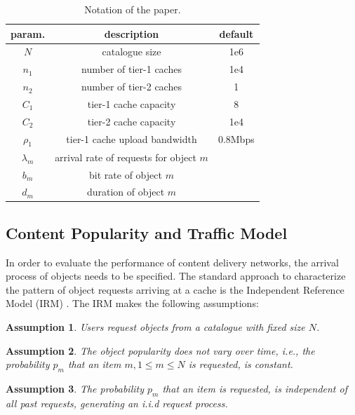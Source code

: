 \begin{table}[tb]
\centering
\caption{Notation of the paper.}
\label{tab:notation}
\begin{tabular}{|c|c|c|}
\hline
param. & description & default \\
\hline
$N$ & catalogue size & 1e6 \\
$n_{1}$ & number of tier-1 caches & 1e4 \\
$n_{2}$ & number of tier-2 caches & 1 \\
$C_{1}$ & tier-1 cache capacity & 8 \\
$C_{2}$ & tier-2 cache capacity & 1e4 \\
$\rho_{1}$ & tier-1 cache upload bandwidth & 0.8Mbps \\
$\lambda_m$ & arrival rate of requests for object $m$& \\
$b_m$ & bit rate of object $m$& \\
$d_m$ & duration of object $m$& \\
\hline
\end{tabular}
\end{table}

\subsection{Content Popularity and Traffic Model}\label{sec:hierarchical:background:traffic}

In order to evaluate the performance of content delivery networks, the arrival process of objects needs to be specified.
The standard approach to characterize the pattern of object requests arriving at a cache is the Independent Reference Model (IRM) \cite{coffman1973operating}.
The IRM makes the following assumptions:

\newtheorem{irma}{Assumption}\begin{irma}\label{catalouge}
Users request objects from a catalogue with fixed size $N$.
\end{irma}
\newtheorem{irmb}[irma]{Assumption}\begin{irmb}\label{pmc}
The object popularity does not vary over time, i.e., the probability $p_m$ that an item $m, 1\leq m \leq N$ is requested, is constant.
\end{irmb}
\newtheorem{irmc}[irma]{Assumption}\begin{irmc}\label{iid}
The probability $p_m$ that an item is requested, is independent of all past requests, generating an i.i.d request process.
\end{irmc}

